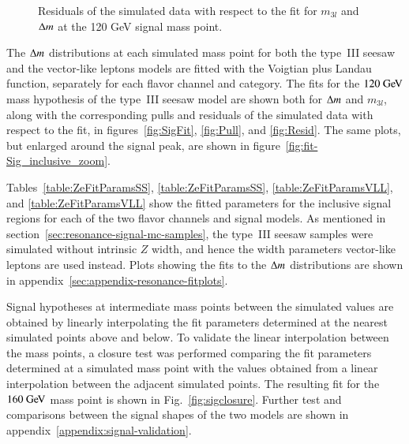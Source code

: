 \begin{figure}[H!]
\begin{minipage}[c]{\textwidth}
{	}
  \caption{Residuals of the simulated data with respect to the fit for $m_{3l}$ and $\Delta m$ at the 120 GeV signal mass point. }
  \label{fig:Resid}
\end{minipage}
\label{fig:SigFit120}
\end{figure} 

The $\Delta m$ distributions at each simulated mass point for both the type~III seesaw and the vector-like leptons models are fitted with the Voigtian plus Landau function, separately for each flavor channel and category. The fits for the $120 \GeV$ mass hypothesis of the type~III seesaw model are shown both for $\Delta m$ and  $m_{3l}$, along with the corresponding pulls and residuals of the simulated data with respect to the fit, in figures~\ref{fig:SigFit}, \ref{fig:Pull}, and \ref{fig:Resid}. The same plots, but enlarged around the signal peak, are shown in figure~\ref{fig:fit-Sig_inclusive_zoom}. 

Tables~\ref{table:ZeFitParamsSS}, \ref{table:ZeFitParamsSS}, \ref{table:ZeFitParamsVLL}, and \ref{table:ZeFitParamsVLL} show the fitted parameters for the inclusive signal regions for each of the two flavor channels and signal models. As mentioned in section~\ref{sec:resonance-signal-mc-samples}, the type~III seesaw samples were simulated without intrinsic $Z$ width, and hence the width parameters vector-like leptons are used instead. Plots showing the fits to the $\Delta m$ distributions are shown in appendix~\ref{sec:appendix-resonance-fitplots}.

Signal hypotheses at intermediate mass points between the simulated values are obtained by linearly interpolating the fit parameters determined at the nearest simulated points above and below. To validate the linear interpolation between the mass points, a closure test was performed comparing the fit parameters determined at a simulated mass point with the values obtained from a linear interpolation between the adjacent simulated points. The resulting fit for the $160 \GeV$ mass point is shown in Fig.~\ref{fig:sigclosure}. Further test and comparisons between the signal shapes of the two models are shown in appendix~\ref{appendix:signal-validation}.

